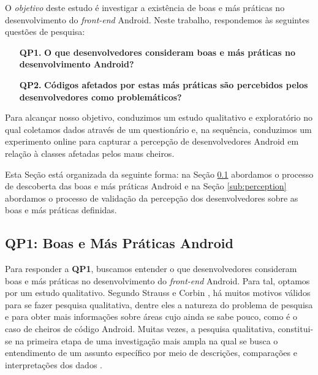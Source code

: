 O \emph{objetivo} deste estudo é investigar a existência de boas e más práticas no desenvolvimento do \textit{front-end} Android. Neste trabalho, respondemos às seguintes questões de pesquisa:

\begin{itemize}
	\sloppy
	\item[\textbf{QP1.}] \textbf{O que desenvolvedores consideram boas e más práticas no desenvolvimento Android?}

	\item[\textbf{QP2.}] \textbf{Códigos afetados por estas más práticas são percebidos pelos desenvolvedores como problemáticos?}
\end{itemize}

Para alcançar nosso objetivo, conduzimos um estudo qualitativo e exploratório no qual coletamos dados através de um questionário e, na sequência, conduzimos um experimento online para capturar a percepção de desenvolvedores Android em relação à classes afetadas pelos maus cheiros. 


Esta Seção está organizada da seguinte forma: na Seção \ref{sub:smells} abordamos o processo de descoberta das boas e más práticas Android e na Seção \ref{sub:perception} abordamos o processo de validação da percepção dos desenvolvedores sobre as boas e más práticas definidas. 

\subsection{QP1: Boas e Más Práticas Android}
\label{sub:smells}

Para responder a \textbf{QP1}, buscamos entender o que desenvolvedores consideram boas e más práticas no desenvolvimento do \textit{front-end} Android. Para tal, optamos por um estudo qualitativo.
Segundo Strauss e Corbin \cite{Strauss2007}, há muitos motivos válidos para se fazer pesquisa qualitativa, dentre eles a natureza do problema de pesquisa e para obter mais informações sobre áreas cujo ainda se sabe pouco, como é o caso de cheiros de código Android. Muitas vezes, a pesquisa qualitativa, constitui-se na primeira etapa de uma investigação mais ampla na qual se busca o entendimento de um assunto específico por meio de descrições, comparações e interpretações dos dados \cite{Prikladnicki, Prates2015}.


